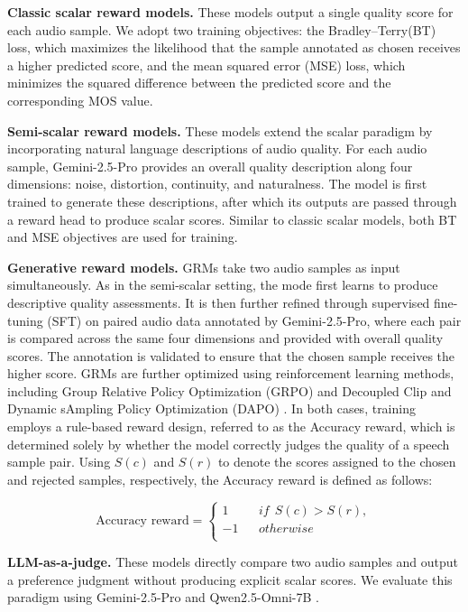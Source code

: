 \textbf{Classic scalar reward models.} These models output a single quality score for each audio sample. We adopt two training objectives: the Bradley–Terry(BT) \citep{btloss} loss, which maximizes the likelihood that the sample annotated as chosen receives a higher predicted score, and the mean squared error (MSE) loss, which minimizes the squared difference between the predicted score and the corresponding MOS value.


\textbf{Semi-scalar reward models.} These models extend the scalar paradigm by incorporating natural language descriptions of audio quality. For each audio sample, Gemini-2.5-Pro \citep{comanici2025gemini} provides an overall quality description along four dimensions: noise, distortion, continuity, and naturalness. The model is first trained to generate these descriptions, after which its outputs are passed through a reward head to produce scalar scores. Similar to classic scalar models, both BT and MSE objectives are used for training.


\textbf{Generative reward models.} GRMs take two audio samples as input simultaneously. As in the semi-scalar setting, the mode first learns to produce descriptive quality assessments. It is then further refined through supervised fine-tuning (SFT) on paired audio data annotated by Gemini-2.5-Pro, where each pair is compared across the same four dimensions and provided with overall quality scores. The annotation is validated to ensure that the chosen sample receives the higher score. 
GRMs are further optimized using reinforcement learning methods, including Group Relative Policy Optimization (GRPO) \citep{grpo} and Decoupled Clip and Dynamic sAmpling Policy Optimization (DAPO) \citep{yu2025dapo}. In both cases, training employs a rule-based reward design, referred to as the Accuracy reward, which is determined solely by whether the model correctly judges the quality of a speech sample pair. Using $S(c)$ and $S(r)$ to denote the scores assigned to the chosen and rejected samples, respectively, the Accuracy reward is defined as follows:

\begin{equation}
\text{Accuracy reward}=\left\{
                \begin{array}{lcl}
                        1  &     & if\ \ S(c)>S(r),\\
             -1  &     & otherwise\\
                \end{array} \right.
\end{equation}


\textbf{LLM-as-a-judge.} These models directly compare two audio samples and output a preference judgment without producing explicit scalar scores. We evaluate this paradigm using Gemini-2.5-Pro and Qwen2.5-Omni-7B \citep{xu2025qwen2omni}.
